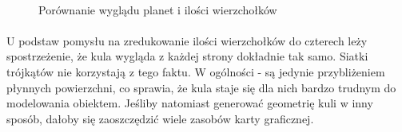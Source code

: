 \begin{figure}
\centering
	   \hspace{.0\textwidth}
	   \hspace{.0\textwidth}
	   \hspace{.0\textwidth} \\
	 \hspace{.0\textwidth} 
\caption{Porównanie wyglądu planet i ilości wierzchołków}
\label{fig:geom}
\end{figure}

\paragraph{}

U podstaw pomysłu na zredukowanie ilości wierzchołków do czterech leży spostrzeżenie, że kula wygląda z każdej strony dokładnie tak samo. Siatki trójkątów nie korzystają z tego faktu. W ogólności - są jedynie przybliżeniem płynnych powierzchni, co sprawia, że kula staje się dla nich bardzo trudnym do modelowania obiektem. Jeśliby natomiast generować geometrię kuli w inny sposób, dałoby się zaoszczędzić wiele zasobów karty graficznej.

